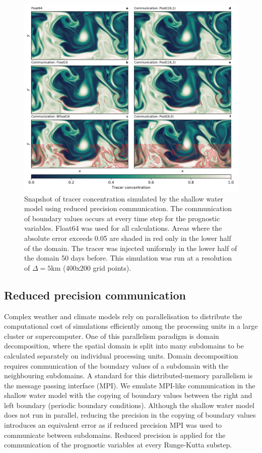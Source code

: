 \documentclass[draft]{agujournal2019}
\begin{document}
\begin{figure}
\includegraphics[width=1\textwidth]{../plots/snapshot_comm.png}
\caption{Snapshot of tracer concentration simulated by the shallow water model using reduced precision communication. The communication of boundary values occurs at every time step for the prognostic variables. Float64 was used for all calculations. Areas where the absolute error exceeds 0.05 are shaded in red only in the lower half of the domain. The tracer was injected uniformly in the lower half of the domain 50 days before. This simulation was run at a resolution of $\Delta = 5$km (400x200 grid points).}
\label{fig:snapshot_comm}
\end{figure}

\subsection{Reduced precision communication}
\label{sec:comm}

Complex weather and climate models rely on parallelisation to distribute the computational cost of simulations efficiently among the processing units in a large cluster or supercomputer. One of this parallelism paradigm is domain decomposition, where the spatial domain is split into many subdomains to be calculated separately on individual processing units. Domain decomposition requires communication of the boundary values of a subdomain with the neighbouring subdomains. A standard for this distributed-memory parallelism is the message passing interface (MPI). We emulate MPI-like communication in the shallow water model with the copying of boundary values between the right and left boundary (periodic boundary conditions). Although the shallow water model does not run in parallel, reducing the precision in the copying of boundary values introduces an equivalent error as if reduced precision MPI was used to communicate between subdomains. Reduced precision is applied for the communication of the prognostic variables at every Runge-Kutta substep.
\end{document}
